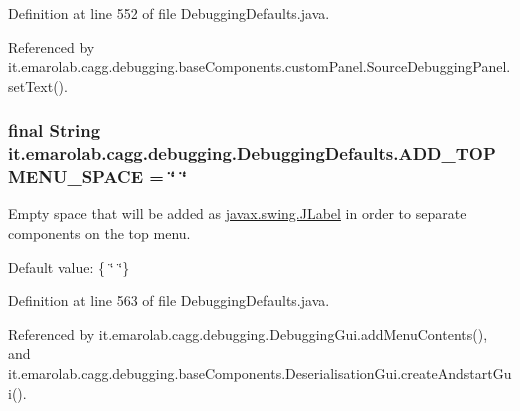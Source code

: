 Definition at line 552 of file Debugging\-Defaults.\-java.



Referenced by it.\-emarolab.\-cagg.\-debugging.\-base\-Components.\-custom\-Panel.\-Source\-Debugging\-Panel.\-set\-Text().

\hypertarget{classit_1_1emarolab_1_1cagg_1_1debugging_1_1DebuggingDefaults_a5c0d10c1d4825146dab96ec01c3e94df}{
\subsubsection[{A\-D\-D\-\_\-\-T\-O\-P\-M\-E\-N\-U\-\_\-\-S\-P\-A\-C\-E}]{\setlength{\rightskip}{0pt plus 5cm}final String it.\-emarolab.\-cagg.\-debugging.\-Debugging\-Defaults.\-A\-D\-D\-\_\-\-T\-O\-P\-M\-E\-N\-U\-\_\-\-S\-P\-A\-C\-E = \char`\"{} \char`\"{}\hspace{0.3cm}{\ttfamily [static]}}}\label{classit_1_1emarolab_1_1cagg_1_1debugging_1_1DebuggingDefaults_a5c0d10c1d4825146dab96ec01c3e94df}
Empty space that will be added as \hyperlink{}{javax.\-swing.\-J\-Label} in order to separate components on the top menu.\par
 Default value\-: \{ \char`\"{}   \char`\"{}\} 

Definition at line 563 of file Debugging\-Defaults.\-java.



Referenced by it.\-emarolab.\-cagg.\-debugging.\-Debugging\-Gui.\-add\-Menu\-Contents(), and it.\-emarolab.\-cagg.\-debugging.\-base\-Components.\-Deserialisation\-Gui.\-create\-Andstart\-Gui().

